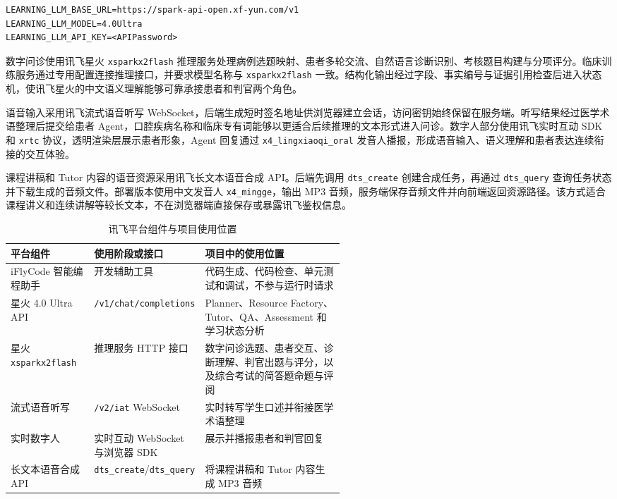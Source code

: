 \begin{lstlisting}
LEARNING_LLM_BASE_URL=https://spark-api-open.xf-yun.com/v1
LEARNING_LLM_MODEL=4.0Ultra
LEARNING_LLM_API_KEY=<APIPassword>
\end{lstlisting}

数字问诊使用讯飞星火 \texttt{xsparkx2flash} 推理服务处理病例选题映射、患者多轮交流、自然语言诊断识别、考核题目构建与分项评分。临床训练服务通过专用配置连接推理接口，并要求模型名称与 \texttt{xsparkx2flash} 一致。结构化输出经过字段、事实编号与证据引用检查后进入状态机，使讯飞星火的中文语义理解能够可靠承接患者和判官两个角色。

语音输入采用讯飞流式语音听写 WebSocket，后端生成短时签名地址供浏览器建立会话，访问密钥始终保留在服务端。听写结果经过医学术语整理后提交给患者 Agent，口腔疾病名称和临床专有词能够以更适合后续推理的文本形式进入问诊。数字人部分使用讯飞实时互动 SDK 和 \texttt{xrtc} 协议，透明渲染层展示患者形象，Agent 回复通过 \texttt{x4\_lingxiaoqi\_oral} 发音人播报，形成语音输入、语义理解和患者表达连续衔接的交互体验。

课程讲稿和 Tutor 内容的语音资源采用讯飞长文本语音合成 API。后端先调用 \texttt{dts\_create} 创建合成任务，再通过 \texttt{dts\_query} 查询任务状态并下载生成的音频文件。部署版本使用中文发音人 \texttt{x4\_mingge}，输出 MP3 音频，服务端保存音频文件并向前端返回资源路径。该方式适合课程讲义和连续讲解等较长文本，不在浏览器端直接保存或暴露讯飞鉴权信息。

\begin{table}[H]
  \centering
  \caption{讯飞平台组件与项目使用位置}
  \label{tab:xfyun-integration}
  \begin{tabularx}{\linewidth}{p{0.25\linewidth}p{0.30\linewidth}X}
    \toprule
    平台组件 & 使用阶段或接口 & 项目中的使用位置 \\
    \midrule
    iFlyCode 智能编程助手 & 开发辅助工具 & 代码生成、代码检查、单元测试和调试，不参与运行时请求 \\
    星火 4.0 Ultra API & \texttt{/v1/chat/completions} & Planner、Resource Factory、Tutor、QA、Assessment 和学习状态分析 \\
    星火 \texttt{xsparkx2flash} & 推理服务 HTTP 接口 & 数字问诊选题、患者交互、诊断理解、判官出题与评分，以及综合考试的简答题命题与评阅 \\
    流式语音听写 & \texttt{/v2/iat} WebSocket & 实时转写学生口述并衔接医学术语整理 \\
    实时数字人 & 实时互动 WebSocket 与浏览器 SDK & 展示并播报患者和判官回复 \\
    长文本语音合成 API & \texttt{dts\_create}/\texttt{dts\_query} & 将课程讲稿和 Tutor 内容生成 MP3 音频 \\
    \bottomrule
  \end{tabularx}
\end{table}

